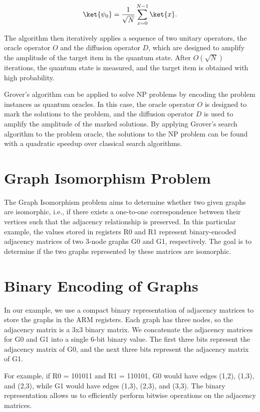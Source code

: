 \begin{equation}
\ket{\psi_0} = \frac{1}{\sqrt{N}}\sum_{x=0}^{N-1}\ket{x}.
\end{equation}

The algorithm then iteratively applies a sequence of two unitary operators, the oracle operator $O$ and the diffusion operator $D$, which are designed to amplify the amplitude of the target item in the quantum state. After $O\left(\sqrt{N}\right)$ iterations, the quantum state is measured, and the target item is obtained with high probability.

Grover's algorithm can be applied to solve NP problems by encoding the problem instances as quantum oracles. In this case, the oracle operator $O$ is designed to mark the solutions to the problem, and the diffusion operator $D$ is used to amplify the amplitude of the marked solutions. By applying Grover's search algorithm to the problem oracle, the solutions to the NP problem can be found with a quadratic speedup over classical search algorithms.

\section{Graph Isomorphism Problem}
The Graph Isomorphism problem aims to determine whether two given graphs are isomorphic, i.e., if there exists a one-to-one correspondence between their vertices such that the adjacency relationship is preserved. In this particular example, the values stored in registers R0 and R1 represent binary-encoded adjacency matrices of two 3-node graphs G0 and G1, respectively. The goal is to determine if the two graphs represented by these matrices are isomorphic.

\section{Binary Encoding of Graphs}
In our example, we use a compact binary representation of adjacency matrices to store the graphs in the ARM registers. Each graph has three nodes, so the adjacency matrix is a 3x3 binary matrix. We concatenate the adjacency matrices for G0 and G1 into a single 6-bit binary value. The first three bits represent the adjacency matrix of G0, and the next three bits represent the adjacency matrix of G1.

For example, if R0 = 101011 and R1 = 110101, G0 would have edges (1,2), (1,3), and (2,3), while G1 would have edges (1,3), (2,3), and (3,3). The binary representation allows us to efficiently perform bitwise operations on the adjacency matrices.

